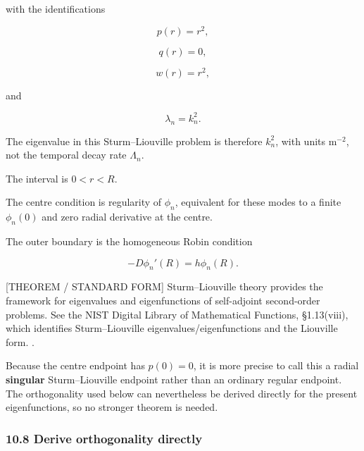\documentclass[11pt,a4paper]{article}
\begin{document}
with the identifications

\begin{equation}
p(r)=r^2,
\tag{TRISO-SL-205}
\label{eq:triso-sl-205}
\end{equation}

\begin{equation}
q(r)=0,
\tag{TRISO-SL-206}
\label{eq:triso-sl-206}
\end{equation}

\begin{equation}
w(r)=r^2,
\tag{TRISO-SL-207}
\label{eq:triso-sl-207}
\end{equation}

and

\begin{equation}
\lambda_n=k_n^2.
\tag{TRISO-SL-208}
\label{eq:triso-sl-208}
\end{equation}

The eigenvalue in this Sturm–Liouville problem is therefore $k_n^2$, with units $\mathrm{m^{-2}}$, not the temporal decay rate $\Lambda_n$.

The interval is $0<r<R$.

The centre condition is regularity of $\phi_n$, equivalent for these modes to a finite $\phi_n(0)$ and zero radial derivative at the centre.

The outer boundary is the homogeneous Robin condition

\begin{equation}
-D\phi_n'(R)=h\phi_n(R).
\tag{TRISO-SL-209}
\label{eq:triso-sl-209}
\end{equation}

[THEOREM / STANDARD FORM] Sturm–Liouville theory provides the framework for eigenvalues and eigenfunctions of self-adjoint second-order problems. See the NIST Digital Library of Mathematical Functions, §1.13(viii), which identifies Sturm–Liouville eigenvalues/eigenfunctions and the Liouville form. \cite{NIST_DLMF}.

Because the centre endpoint has $p(0)=0$, it is more precise to call this a radial \textbf{singular} Sturm–Liouville endpoint rather than an ordinary regular endpoint. The orthogonality used below can nevertheless be derived directly for the present eigenfunctions, so no stronger theorem is needed.

\subsubsection*{10.8 Derive orthogonality directly}
\end{document}
